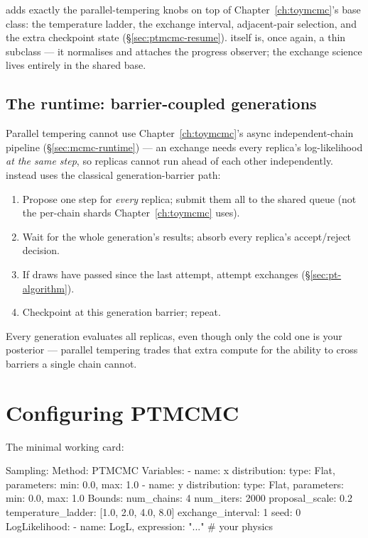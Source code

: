  adds exactly the parallel-tempering knobs on top of
Chapter~\ref{ch:toymcmc}'s base class: the temperature ladder, the exchange interval,
adjacent-pair selection, and the extra checkpoint state
(\S\ref{sec:ptmcmc-resume}).  itself is, once again, a thin
subclass --- it normalises  and attaches the progress
observer; the exchange science lives entirely in the shared base.

\subsection{The runtime: barrier-coupled generations}
\label{sec:ptmcmc-runtime}

Parallel tempering cannot use Chapter~\ref{ch:toymcmc}'s async independent-chain
pipeline (\S\ref{sec:mcmc-runtime}) --- an exchange needs every replica's
log-likelihood \emph{at the same step}, so replicas cannot run ahead of each other
independently.  instead uses the classical generation-barrier path:

\begin{enumerate}
  \item Propose one step for \emph{every} replica; submit them all to the shared
         queue (not the per-chain shards
        Chapter~\ref{ch:toymcmc} uses).
  \item Wait for the whole generation's results; absorb every replica's
        accept/reject decision.
  \item If  draws have passed since the last attempt,
        attempt exchanges (\S\ref{sec:pt-algorithm}).
  \item Checkpoint at this generation barrier; repeat.
\end{enumerate}

Every generation evaluates all  replicas, even though only the
cold one is your posterior --- parallel tempering trades that extra compute for the
ability to cross barriers a single chain cannot.

\section{Configuring PTMCMC}
\label{sec:ptmcmc-yaml}

The minimal working card:

\begin{yamlwin}
Sampling:
  Method: PTMCMC
  Variables:
    - name: x
      distribution: {type: Flat, parameters: {min: 0.0, max: 1.0}}
    - name: y
      distribution: {type: Flat, parameters: {min: 0.0, max: 1.0}}
  Bounds:
    num_chains: 4
    num_iters: 2000
    proposal_scale: 0.2
    temperature_ladder: [1.0, 2.0, 4.0, 8.0]
    exchange_interval: 1
    seed: 0
  LogLikelihood:
    - {name: LogL, expression: "..."}   # your physics
\end{yamlwin}

